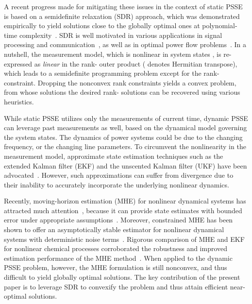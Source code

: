 \documentclass[conference]{IEEEtran}
\begin{document}
A recent progress made for mitigating these issues in the context of static PSSE is based on a semidefinite relaxation (SDR) approach, which was demonstrated empirically to yield solutions close to the globally optimal ones at polynomial-time complexity~\cite{naps:zhu2011}. SDR is well motivated in various applications in signal processing and communication~\cite{spm:luo2010}, as well as in optimal power flow problems~\cite{bai2008, tps:low2012, tsm:dall2013}. In a nutshell, the measurement model, which is nonlinear in system states , is re-expressed as {\em linear} in the rank- outer product  ( denotes Hermitian transpose), which leads to a semidefinite programming problem except for the rank- constraint. Dropping the nonconvex rank constraints yields a convex problem, from whose solutions the desired rank- solutions can be recovered using various heuristics.




While static PSSE utilizes only the measurements of current time, dynamic PSSE can leverage past measurements as well, based on the dynamical model governing the system states. The dynamics of power systems could be due to the changing frequency, or the changing line parameters. To circumvent the nonlinearity in the measurement model, approximate state estimation techniques such as the extended Kalman filter (EKF) and the unscented Kalman filter (UKF) have been advocated~\cite{HuS02, Val11}. However, such approximations can suffer from divergence due to their inability to accurately incorporate the underlying nonlinear dynamics.





Recently, moving-horizon estimation (MHE) for nonlinear dynamical systems has attracted much attention~\cite{auto:alessandri2008}, because it can provide state estimates with bounded error under appropriate assumptions~\cite{auto:alessandri2008}. Moreover, constrained MHE has been shown to offer an asymptotically stable estimator for nonlinear dynamical systems with deterministic noise terms~\cite{tac:rao2003}. Rigorous comparison of MHE and EKF for nonlinear chemical processes corroborated the robustness and improved estimation performance of the MHE method~\cite{haseltine2005critical}. When applied to the dynamic PSSE problem, however, the MHE formulation is still nonconvex, and thus difficult to yield globally optimal solutions. The key contribution of the present paper is to leverage SDR to convexify the problem and thus attain efficient near-optimal solutions.
\end{document}
